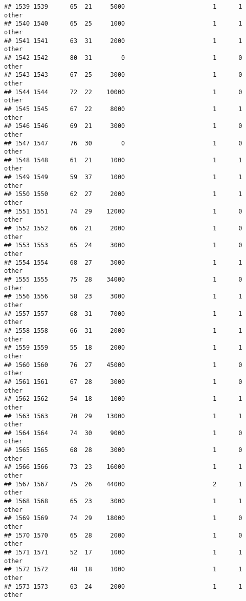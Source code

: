\documentclass[
]{article}
\begin{document}
\begin{verbatim}
## 1539 1539      65  21     5000                        1      1    other
## 1540 1540      65  25     1000                        1      1    other
## 1541 1541      63  31     2000                        1      1    other
## 1542 1542      80  31        0                        1      0    other
## 1543 1543      67  25     3000                        1      0    other
## 1544 1544      72  22    10000                        1      0    other
## 1545 1545      67  22     8000                        1      1    other
## 1546 1546      69  21     3000                        1      0    other
## 1547 1547      76  30        0                        1      0    other
## 1548 1548      61  21     1000                        1      1    other
## 1549 1549      59  37     1000                        1      1    other
## 1550 1550      62  27     2000                        1      1    other
## 1551 1551      74  29    12000                        1      0    other
## 1552 1552      66  21     2000                        1      0    other
## 1553 1553      65  24     3000                        1      0    other
## 1554 1554      68  27     3000                        1      1    other
## 1555 1555      75  28    34000                        1      0    other
## 1556 1556      58  23     3000                        1      1    other
## 1557 1557      68  31     7000                        1      1    other
## 1558 1558      66  31     2000                        1      1    other
## 1559 1559      55  18     2000                        1      1    other
## 1560 1560      76  27    45000                        1      0    other
## 1561 1561      67  28     3000                        1      0    other
## 1562 1562      54  18     1000                        1      1    other
## 1563 1563      70  29    13000                        1      1    other
## 1564 1564      74  30     9000                        1      0    other
## 1565 1565      68  28     3000                        1      0    other
## 1566 1566      73  23    16000                        1      1    other
## 1567 1567      75  26    44000                        2      1    other
## 1568 1568      65  23     3000                        1      1    other
## 1569 1569      74  29    18000                        1      0    other
## 1570 1570      65  28     2000                        1      0    other
## 1571 1571      52  17     1000                        1      1    other
## 1572 1572      48  18     1000                        1      1    other
## 1573 1573      63  24     2000                        1      1    other

\end{verbatim}
\end{document}
